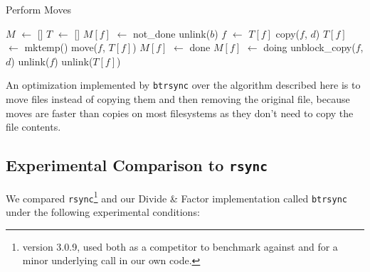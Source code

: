 \documentclass[11pt]{llncs}
\newcommand*\Let[2]{\State #1 $\gets$ #2}
\newcommand{\btrsync}{\texttt{btrsync}\xspace}
\newcommand{\rsync}{\texttt{rsync}\xspace}
\begin{document}
\begin{algorithm}
  \caption{Perform Moves}
  \label{alg:moves}
  \begin{algorithmic}[1]
    \Statex
    \Let{$M$}{[]}
    \Let{$T$}{[]}
      \Let{$M[f]$}{not\_done}
    \EndFor
          \State unlink($b$) 
        \Else
          \State {} 
        \EndIf
      \EndIf
        \Let{$f$}{$T[f]$}
      \EndIf
      \State copy($f$, $d$)
    \EndFunction
        \State \Return {}
      \EndIf
        \Let{$T[f]$}{mktemp()}
        \State move($f$, $T[f]$)
        \Let{$M[f]$}{done}
        \State \Return {}
      \EndIf
      \Let{$M[f]$}{doing}
          \State unblock\_copy($f$, $d$) 
        \EndIf
      \EndFor
        \State unlink($f$)
      \EndIf
        \State unlink($T[f]$)
      \EndIf
    \EndFunction

      \State {}
    \EndFor
  \end{algorithmic}
\end{algorithm}

An optimization implemented by \btrsync over the algorithm described here is to
move files instead of copying them and then removing the original file, because
moves are faster than copies on most filesystems as they don't need to copy the
file contents.

\subsection{Experimental Comparison to \rsync}

We compared \rsync\footnote{version 3.0.9, used both as a competitor to benchmark against and for a minor underlying call in our own code.}
and our Divide \& Factor implementation called \btrsync under the following experimental conditions:
\end{document}
